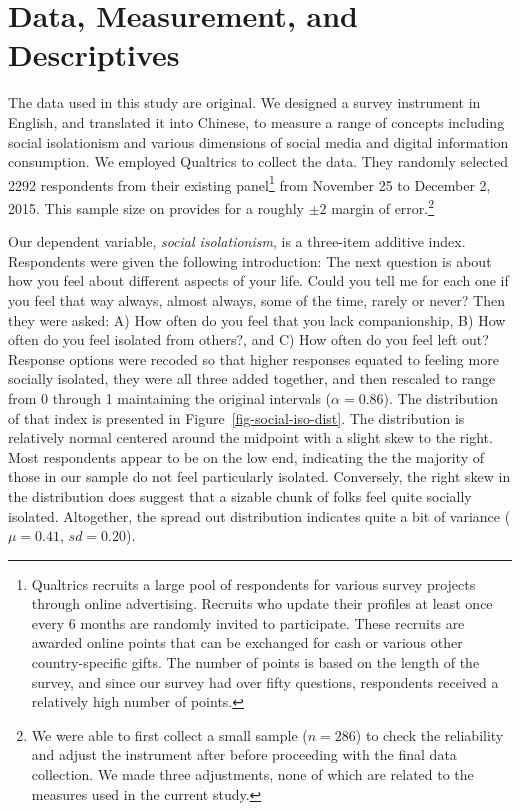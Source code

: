 \documentclass[]{interact}
\theoremstyle{plain}%
\theoremstyle{definition}
\theoremstyle{remark}
\begin{document}
\hypertarget{data-measurement-and-descriptives}{%
\section{Data, Measurement, and
Descriptives}\label{data-measurement-and-descriptives}}

The data used in this study are original. We designed a survey
instrument in English, and translated it into Chinese, to measure a
range of concepts including social isolationism and various dimensions
of social media and digital information consumption. We employed
Qualtrics to collect the data. They randomly selected 2292 respondents
from their existing panel\footnote{Qualtrics recruits a large pool of
  respondents for various survey projects through online advertising.
  Recruits who update their profiles at least once every 6 months are
  randomly invited to participate. These recruits are awarded online
  points that can be exchanged for cash or various other
  country-specific gifts. The number of points is based on the length of
  the survey, and since our survey had over fifty questions, respondents
  received a relatively high number of points.} from November 25 to
December 2, 2015. This sample size on provides for a roughly \(\pm2\)
margin of error.\footnote{We were able to first collect a small sample
  (\(n=286\)) to check the reliability and adjust the instrument after
  before proceeding with the final data collection. We made three
  adjustments, none of which are related to the measures used in the
  current study.}

Our dependent variable, \emph{social isolationism}, is a three-item
additive index. Respondents were given the following introduction: The
next question is about how you feel about different aspects of your
life. Could you tell me for each one if you feel that way always, almost
always, some of the time, rarely or never? Then they were asked: A) How
often do you feel that you lack companionship, B) How often do you feel
isolated from others?, and C) How often do you feel left out? Response
options were recoded so that higher responses equated to feeling more
socially isolated, they were all three added together, and then rescaled
to range from 0 through 1 maintaining the original intervals
(\(\alpha = 0.86\)). The distribution of that index is presented in
Figure~\ref{fig-social-iso-dist}. The distribution is relatively normal
centered around the midpoint with a slight skew to the right. Most
respondents appear to be on the low end, indicating the the majority of
those in our sample do not feel particularly isolated. Conversely, the
right skew in the distribution does suggest that a sizable chunk of
folks feel quite socially isolated. Altogether, the spread out
distribution indicates quite a bit of variance (\(\mu = 0.41\),
\(sd = 0.20\)).
\end{document}

